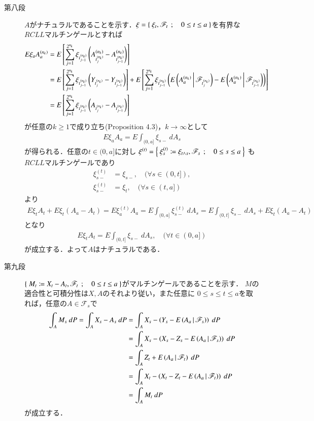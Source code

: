 \begin{prf}
\begin{description}
			\item[第八段]
				$A$がナチュラルであることを示す．$\xi = \left\{\ \xi_t,\mathscr{F}_t\ \, ; \quad 0 \leq t \leq a\ \right\}$を有界な$RCLL$マルチンゲールとすれば
				\begin{align}
					E \xi_a A^{(n_k)}_a 
					&= E\left[ \sum_{j=1}^{2^{n_k}}\xi_{t^{(n_k)}_{j-1}} \left( A^{(n_k)}_{t^{(n_k)}_j} - A^{(n_k)}_{t^{(n_k)}_{j-1}} \right) \right] \\
					&= E\left[ \sum_{j=1}^{2^{n_k}}\xi_{t^{(n_k)}_{j-1}} \left( Y_{t^{(n_k)}_j} - Y_{t^{(n_k)}_{j-1}} \right) \right]
						+ E\left[ \sum_{j=1}^{2^{n_k}}\xi_{t^{(n_k)}_{j-1}} \left( E\left( A^{(n_k)}_a \, \middle|\, \mathscr{F}_{t^{(n_k)}_j} \right) - E\left( A^{(n_k)}_a \, \middle|\, \mathscr{F}_{t^{(n_k)}_{j-1}} \right) \right) \right] \\
					&= E\left[ \sum_{j=1}^{2^{n_k}}\xi_{t^{(n_k)}_{j-1}} \left( A_{t^{(n_k)}_j} - A_{t^{(n_k)}_{j-1}} \right) \right]
				\end{align}
				が任意の$k \geq 1$で成り立ち(Proposition 4.3)，$k \longrightarrow \infty$として
				\begin{align}
					E \xi_a A_a = E \int_{(0,a]} \xi_{s-}\ dA_s
				\end{align}
				が得られる．任意の$t \in (0,a]$に対し
				$\xi^{(t)} = \left\{\ \xi^{(t)}_s \coloneqq \xi_{t \wedge s},\mathscr{F}_s\ \, ; \quad 0 \leq s \leq a\ \right\}$
				も$RCLL$マルチンゲールであり
				\begin{align}
					\xi^{(t)}_{s-} &= \xi_{s-},\quad (\forall s \in (0,t]), \\
					\xi^{(t)}_{s-} &= \xi_t, \quad (\forall s \in (t,a])
				\end{align}
				より
				\begin{align}
					E \xi_t A_t + E \xi_t(A_a - A_t) = E \xi^{(t)}_a A_a 
					= E \int_{(0,a]} \xi^{(t)}_{s-}\ dA_s
					= E \int_{(0,t]} \xi_{s-}\ dA_s + E \xi_t (A_a - A_t)
				\end{align}
				となり
				\begin{align}
					E \xi_t A_t = E \int_{(0,t]} \xi_{s-}\ dA_s,
					\quad (\forall t \in (0,a])
				\end{align}
				が成立する．よって$A$はナチュラルである．
				
			\item[第九段]
				$\left\{\ M_t \coloneqq X_t - A_t, \mathscr{F}_t\ \, ; \quad 0 \leq t \leq a\ \right\}$がマルチンゲールであることを示す．
				$M$の適合性と可積分性は$X,A$のそれより従い，また任意に
				$0 \leq s \leq t \leq a$を取れば，任意の$A \in \mathscr{F}_s$で
				\begin{align}
					\int_A M_s\ dP = \int_A X_s - A_s\ dP
					&= \int_A X_s - \left(Y_s - E\left( A_a \, \middle|\, \mathscr{F}_s \right)\right)\ dP \\
					&= \int_A X_s - \left(X_s - Z_s - E\left( A_a \, \middle|\, \mathscr{F}_s \right)\right)\ dP \\
					&= \int_A Z_t + E\left( A_a \, \middle|\, \mathscr{F}_t \right)\ dP \\
					&= \int_A X_t - \left(X_t - Z_t - E\left( A_a \, \middle|\, \mathscr{F}_t \right)\right)\ dP \\
					&= \int_A M_t\ dP
				\end{align}
				が成立する．
				\QED
		\end{description}
	\end{prf}
	

